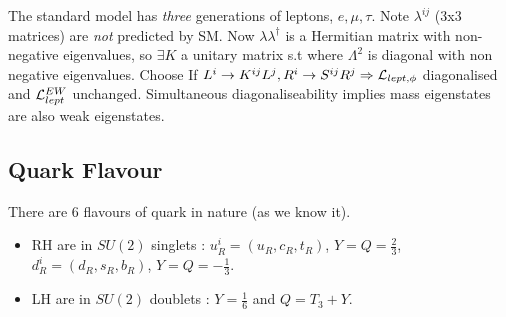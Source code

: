 \documentclass{article}
\begin{document}
The standard model has \emph{three} generations of leptons, $e,\mu,\tau$. 
Note $\lambda^{ij}$ (3x3 matrices) are \emph{not} predicted by SM. Now $\lambda \lambda^\dagger$ is a Hermitian matrix with non-negative eigenvalues, so $\exists K$ a unitary matrix s.t 
where $\Lambda^2$ is diagonal with non negative eigenvalues. Choose  
If $L^i \to K^{ij} L^j, R^i \to S^{ij} R^j \Rightarrow \mathcal{L}_{lept,\phi}$ diagonalised and $\mathcal{L}_{lept}^{EW}$ unchanged. Simultaneous diagonaliseability implies mass eigenstates are also weak eigenstates.  


\subsection{Quark Flavour}
There are 6 flavours of quark in nature (as we know it). 
\begin{itemize}
    \item RH are in $SU(2)$ singlets : $u_R^i = (u_R, c_R, t_R)$, $Y = Q = \frac{2}{3}$, $d_R^i = (d_R, s_R, b_R)$, $Y = Q = -\frac{1}{3}$. 
    \item LH are in $SU(2)$ doublets : 
    $Y = \frac{1}{6}$ and $Q = T_3 + Y$. 
\end{itemize}
\end{document}
